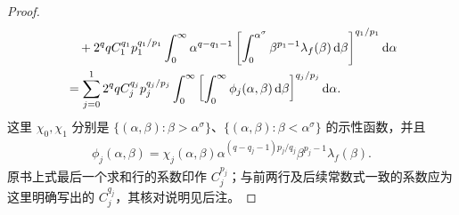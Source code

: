 \documentclass[../../main.tex]{subfiles}
\begin{document}
\begin{proof}
\begin{align}
&\quad+2^qqC_1^{q_1}p_1^{q_1/p_1}\int_0^\infty\alpha^{q-q_1-1}
\left[\int_0^{\alpha^\sigma}\beta^{p_1-1}\lambda_f(\beta)\,\mathrm d\beta\right]^{q_1/p_1}\mathrm d\alpha\notag\\
&=\sum_{j=0}^1 2^qqC_j^{q_j}p_j^{q_j/p_j}
\int_0^\infty\left[\int_0^\infty\phi_j(\alpha,\beta)\,\mathrm d\beta\right]^{q_j/p_j}\mathrm d\alpha.
\label{align:ch06-marcinkiewicz-two-integrals}
\end{align}
这里 $\chi_0,\chi_1$ 分别是 $\{(\alpha,\beta):\beta>\alpha^\sigma\}$、$\{(\alpha,\beta):\beta<\alpha^\sigma\}$ 的示性函数，并且
\begin{align*}
\phi_j(\alpha,\beta)=\chi_j(\alpha,\beta)
\alpha^{(q-q_j-1)p_j/q_j}\beta^{p_j-1}\lambda_f(\beta).
\end{align*}
原书上式最后一个求和行的系数印作 $C_j^{p_j}$；与前两行及后续常数式一致的系数应为这里明确写出的 $C_j^{q_j}$，其核对说明见后注。


\end{proof}
\end{document}

